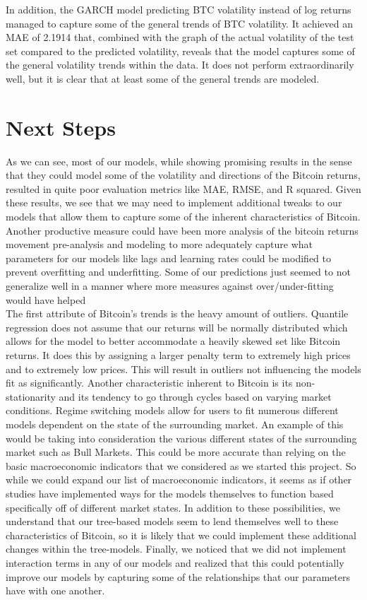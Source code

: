 \documentclass{article}
\begin{document}
In addition, the GARCH model predicting BTC volatility instead of log returns managed to capture some of the general trends of BTC volatility. It achieved an MAE of 2.1914 that, combined with the graph of the actual volatility of the test set compared to the predicted volatility, reveals that the model captures some of the general volatility trends within the data. It does not perform extraordinarily well, but it is clear that at least some of the general trends are modeled. 

\section{Next Steps}
As we can see, most of our models, while showing promising results in the sense that they could model some of the volatility and directions of the Bitcoin returns, resulted in quite poor evaluation metrics like MAE, RMSE, and R squared. Given these results, we see that we may need to implement additional tweaks to our models that allow them to capture some of the inherent characteristics of Bitcoin. Another productive measure could have been more analysis of the bitcoin returns movement pre-analysis and modeling to more adequately capture what parameters for our models like lags and learning rates could be modified to prevent overfitting and underfitting. Some of our predictions just seemed to not generalize well in a manner where more measures against over/under-fitting would have helped\\

 The first attribute of Bitcoin’s trends is the heavy amount of outliers. Quantile regression does not assume that our returns will be normally distributed which allows for the model to better accommodate a heavily skewed set like Bitcoin returns. It does this by assigning a larger penalty term to extremely high prices and to extremely low prices. This will result in outliers not influencing the models fit as significantly. Another characteristic inherent to Bitcoin is its non-stationarity and its tendency to go through cycles based on varying market conditions. Regime switching models allow for users to fit numerous different models dependent on the state of the surrounding market. An example of this would be taking into consideration the various different states of the surrounding market such as Bull Markets. This could be more accurate than relying on the basic macroeconomic indicators that we considered as we started this project. So while we could expand our list of macroeconomic indicators, it seems as if other studies have implemented ways for the models themselves to function based specifically off of different market states. In addition to these possibilities, we understand that our tree-based models seem to lend themselves well to these characteristics of Bitcoin, so it is likely that we could implement these additional changes within the tree-models. Finally, we noticed that we did not implement interaction terms in any of our models and realized that this could potentially improve our models by capturing some of the relationships that our parameters have with one another. \\
 
\end{document}
